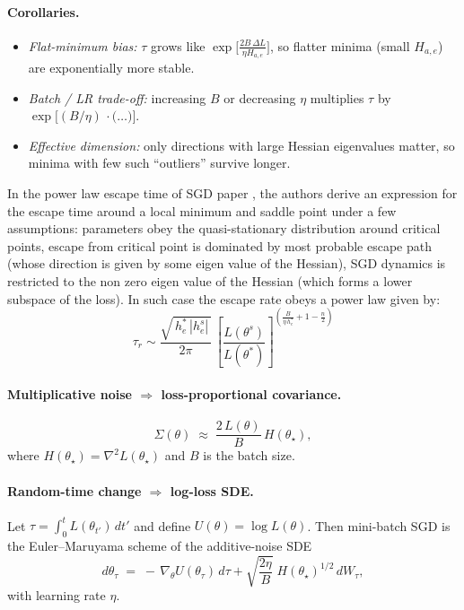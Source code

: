 \documentclass[11pt]{article}
\begin{document}
\paragraph{Corollaries.}
\begin{itemize}
  \item \emph{Flat-minimum bias:} $\tau$ grows like
        $\exp\!\bigl[\tfrac{2B\,\Delta L}{\eta H_{a,e}}\bigr]$,
        so flatter minima (small $H_{a,e}$) are exponentially more stable.
  \item \emph{Batch / LR trade-off:} increasing $B$ or decreasing $\eta$
        multiplies $\tau$ by $\exp\!\bigl[(B/\eta)\,\cdot\!\bigl(\ldots\bigr)\bigr]$.
  \item \emph{Effective dimension:} only directions with large Hessian
        eigenvalues matter, so minima with few such “outliers” survive longer.
\end{itemize}
In the power law escape time of SGD paper \citep{mori2022power}, the authors derive an expression for the escape time around a local minimum and saddle point under a few assumptions: parameters obey the quasi-stationary distribution around critical points, escape from critical point is dominated by most probable escape path (whose direction is given by some eigen value of the Hessian), SGD dynamics is restricted to the non zero eigen value of the Hessian (which forms a lower subspace of the loss). In such case the escape rate obeys a power law given by:
\[
\tau_r \sim 
\frac{\sqrt{\,h_e^{*}\,|h_e^{s}|\,}}{2\pi}\,
\left[\frac{L(\theta^{s})}{L(\theta^{*})}\right]^{
\left(\frac{B}{\eta\,h_e^{*}} + 1 - \frac{n}{2}\right)}
\]
\paragraph{Multiplicative noise $\Rightarrow$ loss-proportional covariance.}

\begin{equation}
  \Sigma(\theta)\;\approx\;
  \frac{2\,L(\theta)}{B}\,
  H(\theta_\star),
  \tag{6}
\end{equation}
where $H(\theta_\star)=\nabla^{2}L(\theta_\star)$ and $B$ is the batch size.

\paragraph{Random-time change $\Rightarrow$ log-loss SDE.}

Let $\displaystyle \tau=\!\int_{0}^{t}L(\theta_{t'})\,dt'$ and
define $U(\theta)=\log L(\theta)$.  Then mini-batch SGD is the
Euler–Maruyama scheme of the additive-noise SDE
\begin{equation}
  d\theta_\tau
  \;=\;
  -\,\nabla_\theta U(\theta_\tau)\,d\tau
  +\sqrt{\frac{2\eta}{B}}\;
    H(\theta_\star)^{1/2}\,dW_\tau ,
  \tag{14}
\end{equation}
with learning rate $\eta$.
\end{document}

